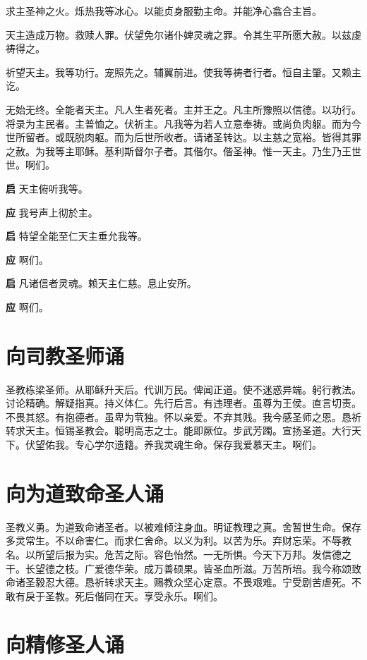 \documentclass[UTF8,17pt]{ctexart}
\begin{document}
求主圣神之⽕。烁热我等冰⼼。以能贞⾝服勤主命。并能净⼼翕合主旨。

天主造成万物。救赎⼈罪。伏望免尔诸仆婢灵魂之罪。令其⽣平所愿⼤赦。以兹虔祷得之。

祈望天主。我等功⾏。宠照先之。辅翼前进。使我等祷者⾏者。恒⾃主肇。又赖主讫。

⽆始⽆终。全能者天主。凡⼈⽣者死者。主并王之。凡主所豫照以信德。以功⾏。将录为主民者。主普恤之。伏祈主。凡我等为若⼈⽴意奉祷。或尚负⾁躯。⽽为今世所留者。或既脱⾁躯。⽽为后世所收者。请诸圣转达。以主慈之宽裕。皆得其罪之赦。为我等主耶稣。基利斯督尔⼦者。其偕尔。偕圣神。惟⼀天主。乃⽣乃王世世。啊们。

\textbf{启} \quad 天主俯听我等。

\textbf{应} \quad 我号声上彻於主。

\textbf{启} \quad 特望全能⾄仁天主垂允我等。

\textbf{应} \quad 啊们。

\textbf{启} \quad 凡诸信者灵魂。赖天主仁慈。息⽌安所。

\textbf{应} \quad 啊们。

\section{向司教圣师诵}

圣教栋梁圣师。从耶稣升天后。代训万民。俾闻正道。使不迷惑异端。躬⾏教法。讨论精确。解疑指真。持义体仁。先⾏后⾔。有违理者。虽尊为王侯。直⾔切责。不畏其怒。有抱德者。虽卑为茕独。怀以亲爱。不弃其贱。我今感圣师之恩。恳祈转求天主。恒锡圣教会。聪明⾼志之⼠。能即厥位。步武芳躅。宣扬圣道。⼤⾏天下。伏望佑我。专⼼学尔遗籍。养我灵魂⽣命。保存我爱慕天主。啊们。

\section{向为道致命圣⼈诵}

圣教义勇。为道致命诸圣者。以被难倾注⾝⾎。明证教理之真。舍暂世⽣命。保存多灵常⽣。不以命害仁。⽽求仁舍命。以义为利。以苦为乐。弃财忘荣。不辱教名。以所望后报为实。危苦之际。容⾊怡然。⼀⽆所惧。今天下万邦。发信德之⼲。长望德之枝。⼴爱德华荣。成万善硕果。皆圣⾎所滋。万苦所培。我今称颂致命诸圣毅忍⼤德。恳祈转求天主。赐教众坚⼼定意。不畏艰难。宁受剧苦虐死。不敢有戾于圣教。死后偕同在天。享受永乐。啊们。

\section{向精修圣⼈诵}
\end{document}
